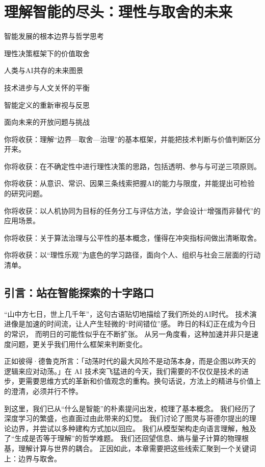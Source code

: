 \chapter{理解智能的尽头：理性与取舍的未来}

\begin{introduction}
\item 智能发展的根本边界与哲学思考
\item 理性决策框架下的价值取舍
\item 人类与AI共存的未来图景
\item 技术进步与人文关怀的平衡
\item 智能定义的重新审视与反思
\item 面向未来的开放问题与挑战
\end{introduction}

\begin{introduction}
\item 你将收获：理解“边界—取舍—治理”的基本框架，并能把技术判断与价值判断区分开来。
\item 你将收获：在不确定性中进行理性决策的思路，包括透明、参与与可逆三项原则。
\item 你将收获：从意识、常识、因果三条线索把握AI的能力与限度，并能提出可检验的研究问题。
\item 你将收获：以人机协同为目标的任务分工与评估方法，学会设计“增强而非替代”的应用场景。
\item 你将收获：关于算法治理与公平性的基本概念，懂得在冲突指标间做出清晰取舍。
\item 你将收获：以“理性乐观”为底色的学习路径，面向个人、组织与社会三层面的行动清单。
\end{introduction}

\section{引言：站在智能探索的十字路口}
“山中方七日，世上几千年”，这句古语贴切地描绘了我们所处的AI时代。
技术演进像是加速的时间流，让人产生轻微的“时间错位”感。
昨日的科幻正在成为今日的常识，
而明日的可能性似乎在不断扩张。
从另一角度看，这种加速并非只是速度问题，更关乎我们用什么框架来判断变化。

正如彼得·德鲁克所言：「动荡时代的最大风险不是动荡本身，而是企图以昨天的逻辑来应对动荡。」在 AI 技术突飞猛进的今天，我们需要的不仅仅是技术的进步，更需要思维方式的革新和价值观念的重构。换句话说，方法上的精进与价值上的澄清，必须并行不悖。

到这里，我们已从“什么是智能”的朴素提问出发，梳理了基本概念。
我们经历了深度学习的繁盛，也直面过由此带来的幻觉。
我们讨论了图灵与哥德尔提出的理论边界，并尝试以多种建构方式加以回应。
我们从模型架构走向语言理解，触及了“生成是否等于理解”的哲学难题。
我们还回望信息、熵与量子计算的物理根基，理解计算与世界的耦合。
正因如此，本章需要把这些线索汇聚到一个关键词上：边界与取舍。

